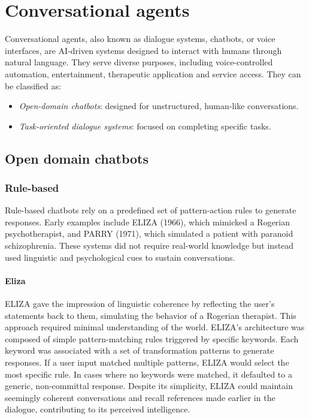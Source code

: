 \section{Conversational agents}

Conversational agents, also known as dialogue systems, chatbots, or voice interfaces, are AI-driven systems designed to interact with humans through natural language. 
They serve diverse purposes, including voice-controlled automation, entertainment, therapeutic application and service access.
They can be classified as: 
\begin{itemize}
    \item \textit{Open-domain chatbots}: designed for unstructured, human-like conversations.
    \item \textit{Task-oriented dialogue systems}: focused on completing specific tasks. 
\end{itemize}

\subsection{Open domain chatbots}
\subsubsection{Rule-based}
Rule-based chatbots rely on a predefined set of pattern-action rules to generate responses. 
Early examples include ELIZA (1966), which mimicked a Rogerian psychotherapist, and PARRY (1971), which simulated a patient with paranoid schizophrenia. 
These systems did not require real-world knowledge but instead used linguistic and psychological cues to sustain conversations.

\paragraph*{Eliza}
ELIZA gave the impression of linguistic coherence by reflecting the user's statements back to them, simulating the behavior of a Rogerian therapist. 
This approach required minimal understanding of the world. ELIZA's architecture was composed of simple pattern-matching rules triggered by specific keywords. 
Each keyword was associated with a set of transformation patterns to generate responses. 
If a user input matched multiple patterns, ELIZA would select the most specific rule. In cases where no keywords were matched, it defaulted to a generic, non-committal response. 
Despite its simplicity, ELIZA could maintain seemingly coherent conversations and recall references made earlier in the dialogue, contributing to its perceived intelligence.

